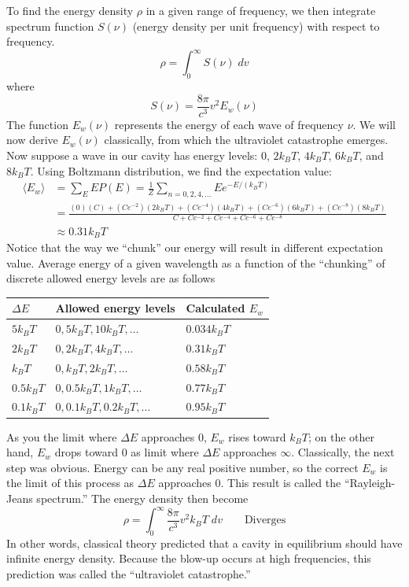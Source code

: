 \documentclass[../../main.tex]{subfiles}
\begin{document}
To find the energy density $\rho$ in a given range of frequency, we then integrate spectrum function $S(\nu)$ (energy density per unit frequency) with respect to frequency. 
\begin{equation*}
    \rho=\int_{0}^{\infty}S(\nu)\;dv
\end{equation*}
where
\begin{equation*}
    S(\nu)=\frac{8\pi}{c^3}v^2E_w(\nu)
\end{equation*}
The function $E_w(\nu)$ represents the energy of each wave of frequency $\nu$. We will now derive $E_w(\nu)$ classically, from which the ultraviolet catastrophe emerges. Now suppose a wave in our cavity has energy levels: $0$, $2k_B T$, $4k_B T$, $6k_B T$, and $8k_B T$. Using Boltzmann distribution, we find the expectation value:
\begin{align*}
    \langle E_w\rangle&=\sum_{E}^{}EP(E)=\frac{1}{Z}\sum_{n=0,2,4,\dots}^{}Ee^{-E/(k_BT)}\\
    &=\frac{(0)(C)+(Ce^{-2})(2k_B T)+(Ce^{-4})(4k_B T)+(Ce^{-6})(6k_B T)+(Ce^{-8})(8k_B T)}{C+Ce^{-2}+Ce^{-4}+Ce^{-6}+Ce^{-8}}\\
    &\approx 0.31k_B T
\end{align*}
Notice that the way we “chunk” our energy will result in different expectation value. Average energy of a given wavelength as a function of the “chunking” of discrete allowed energy levels are as follows
\begin{center}
    \begin{longtable}{|p{}|p{}|p{}|}
        \hline
        $\Delta E$&Allowed energy levels&Calculated $E_w$\\\hline\hline
        $5k_B T$&$0, 5k_B T, 10k_B T, \dots$&$0.034k_B T$\\
        $2k_B T$&$0, 2k_B T, 4k_B T, \dots$&$0.31k_B T$\\
        $k_B T$&$0, k_B T, 2k_B T, \dots$&$0.58k_B T$\\
        $0.5k_B T$&$0, 0.5k_B T, 1k_B T, \dots$&$0.77k_B T$\\
        $0.1k_B T$&$0, 0.1k_B T, 0.2k_B T, \dots$&$0.95k_B T$\\\hline
    \end{longtable}
\end{center}
As you the limit where $\Delta E$ approaches $0$, $E_w$ rises toward $k_B T$; on the other hand, $E_w$ drops toward $0$ as limit where $\Delta E$ approaches $\infty$. Classically, the next step was obvious. Energy can be any real positive number, so the correct $E_w$ is the limit of this process as $\Delta E$ approaches $0$. This result is called the “Rayleigh-Jeans spectrum.” The energy density then become
\begin{equation*}
    \rho=\int_{0}^{\infty}\frac{8\pi}{c^3}v^2k_B T\;dv\qquad\text{Diverges}
\end{equation*}
In other words, classical theory predicted that a cavity in equilibrium should have infinite energy density. Because the blow-up occurs at high frequencies, this prediction was called the “ultraviolet catastrophe.”
\end{document}
